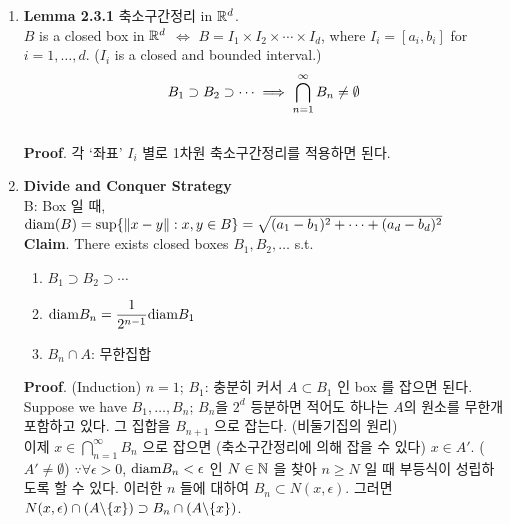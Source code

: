 \begin{enumerate}
	\item \textbf{Lemma 2.3.1} 축소구간정리 in $\mathbb{R}^d$.\\
	$B$ is a closed box in $\mathbb{R}^d$ $\iff$ $B = I_1\times I_2 \times \cdots \times I_d$, where $I_i = [a_i, b_i]$ for $i = 1, \dots, d$. ($I_i$ is a closed and bounded interval.)\\
	$$B_1\supset B_2\supset \cdots \implies \bigcap_{n=1}^\infty B_n \neq \emptyset$$\\
	\textbf{Proof}. 각 `좌표' $I_i$ 별로 1차원 축소구간정리를 적용하면 된다.
	\item \textbf{Divide and Conquer Strategy}\\
	B: Box 일 때, $\text{diam}(B) = \sup\{\left\lVert x-y\right\rVert: x, y\in B \} = \sqrt{(a_1-b_1)^2 + \cdots + (a_d-b_d)^2}$\\
	\textbf{Claim}. There exists closed boxes $B_1, B_2, \dots$ s.t. 
	\begin{enumerate}
		\item $B_1\supset B_2\supset \cdots$
		\item $\text{diam} B_n = \dfrac{1}{2^{n-1}}\text{diam} B_1$
		\item $B_n\cap A$: 무한집합
	\end{enumerate}
	\textbf{Proof}. (Induction) $n = 1$; $B_1$: 충분히 커서 $A\subset B_1$ 인 box 를 잡으면 된다.\\
	Suppose we have $B_1, \dots, B_n$; $B_n$을 $2^d$ 등분하면 적어도 하나는 $A$의 원소를 무한개 포함하고 있다. 그 집합을 $B_{n+1}$ 으로 잡는다. (비둘기집의 원리)\\
	이제 $x\in \bigcap_{n=1}^\infty B_n$ 으로 잡으면 (축소구간정리에 의해 잡을 수 있다) $x\in A'$. ($A'\neq \emptyset$)
	$\because \forall \epsilon>0$, $\text{diam} B_n <\epsilon$ 인 $N\in \mathbb{N}$ 을 찾아 $n\geq N$ 일 때 부등식이 성립하도록 할 수 있다. 이러한 $n$ 들에 대하여 $B_n\subset N(x, \epsilon)$. 그러면 $N(x, \epsilon)\cap (A\backslash \{x\}) \supset B_n\cap (A\backslash \{x\})$.
\end{enumerate}
\pagebreak